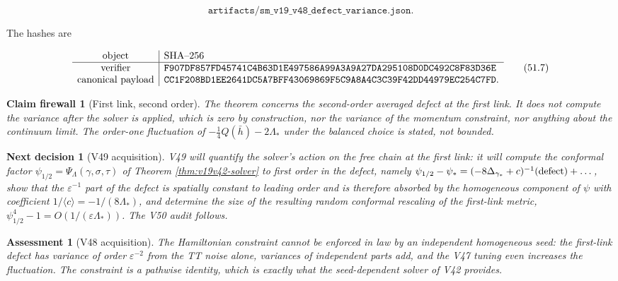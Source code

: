 \documentclass[11pt]{article}
\newtheorem{firewall}[theorem]{Claim firewall}
\newtheorem{decision}[theorem]{Next decision}
\newtheorem{assessment}[theorem]{Assessment}
\theoremstyle{remark}
\begin{document}
\[
 \texttt{artifacts/sm\_v19\_v48\_defect\_variance.json}.             \tag{51.6}
\]

The hashes are

\[
\begin{array}{c|l}
\hbox{object}&\hbox{SHA--256}\\ \hline
\hbox{verifier}&
\texttt{F907DF857FD45741C4B63D1E497586A99A3A9A27DA295108D0DC492C8F83D36E}\\
\hbox{canonical payload}&
\texttt{CC1F208BD1EE2641DC5A7BFF43069869F5C9A8A4C3C39F42DD44979EC254C7FD}.
\end{array}                                                     \tag{51.7}
\]

\begin{firewall}[First link, second order]
\label{fire:v19v48}
The theorem concerns the second-order averaged defect at the first
link.  It does not compute the variance after the solver is applied,
which is zero by construction, nor the variance of the momentum
constraint, nor anything about the continuum limit.  The order-one
fluctuation of \(-\tfrac14Q(\bar h)-2\Lambda_*\) under the balanced
choice is stated, not bounded.
\end{firewall}

\begin{decision}[V49 acquisition]
\label{dec:v19v48-next}
V49 will quantify the solver's action on the free chain at the first
link: it will compute the conformal factor \(\psi_{1/2}=\Psi_\Lambda(\gamma,\sigma,\tau)\)
of Theorem \ref{thm:v19v42-solver} to first order in the defect, namely
\(\psi_{1/2}-\psi_*=(-8\Delta_{\gamma_*}+c)^{-1}(\hbox{defect})+\dots\),
show that the \(\varepsilon^{-1}\) part of the defect is spatially
constant to leading order and is therefore absorbed by the homogeneous
component of \(\psi\) with coefficient \(1/\langle c\rangle=-1/(8\Lambda_*)\),
and determine the size of the resulting random conformal rescaling of
the first-link metric, \(\psi_{1/2}^4-1=O(1/(\varepsilon\Lambda_*))\).
The V50 audit follows.
\end{decision}

\begin{assessment}[V48 acquisition]
\label{ass:v19v48}
The Hamiltonian constraint cannot be enforced in law by an independent
homogeneous seed: the first-link defect has variance of order
\(\varepsilon^{-2}\) from the TT noise alone, variances of independent
parts add, and the V47 tuning even increases the fluctuation.  The
constraint is a pathwise identity, which is exactly what the
seed-dependent solver of V42 provides.
\end{assessment}
\end{document}

